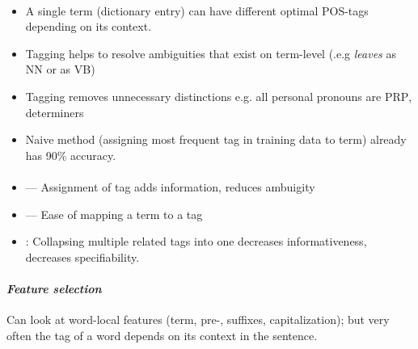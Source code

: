 \documentclass[10pt,twocolumn]{article}
\begin{document}
\paragraph{}
\begin{itemize}
\item A single term (dictionary entry) can have different optimal POS-tags
  depending on its context.
\item Tagging helps to resolve ambiguities that exist on term-level (.e.g
  \textit{leaves} as \textsc{NN} or as \textsc{VB})
\item Tagging removes unnecessary distinctions e.g. all personal pronouns are
  \textsc{PRP}, determiners
\item Naive method (assigning most frequent tag in training data to term)
  already has 90\% accuracy.
\end{itemize}

\paragraph{}
\begin{itemize}
\item \textbf{} --- Assignment of tag adds information,
  reduces ambuigity
\item \textbf{} --- Ease of mapping a term to a tag
\item {}: Collapsing multiple related tags into one decreases
  informativeness, decreases specifiability.
\end{itemize}

\paragraph{\textit{Feature selection}} Can look at word-local features (term,
pre-, suffixes, capitalization); but very often the tag of a word depends on its
context in the sentence.
\end{document}
